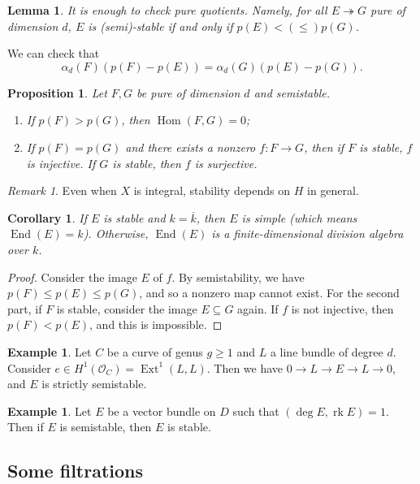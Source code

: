\documentclass[leqno, openany]{memoir}
\newtheorem{cor}[thm]{Corollary}
\newtheorem{prop}[thm]{Proposition}
\newtheorem{lem}[thm]{Lemma}
\theoremstyle{definition}
\newtheorem{exm}[thm]{Example}
\theoremstyle{remark}
\newtheorem{rmk}[thm]{Remark}
\theoremstyle{plain}
\theoremstyle{definition}
\theoremstyle{remark}
\newcommand{\mc}[1]{\mathcal{#1}}
\newcommand{\on}[1]{\operatorname{#1}}
\newcommand{\ol}[1]{\overline{#1}}
\DeclareMathOperator{\Hom}{Hom}
\DeclareMathOperator{\End}{End}
\DeclareMathOperator{\Ext}{Ext}
\begin{document}
\begin{lem}
    It is enough to check pure quotients. Namely, for all $E \twoheadrightarrow G$ pure of dimension $d$, $E$ is (semi)-stable if and only if $p(E) < (\leq) p(G)$.
\end{lem}
We can check that
\[ \alpha_d(F)(p(F) - p(E)) = \alpha_d(G)(p(E) - p(G)). \]

\begin{prop}
    Let $F, G$ be pure of dimension $d$ and semistable.
    \begin{enumerate}
        \item If $p(F) > p(G)$, then $\Hom(F, G) = 0$;
        \item If $p(F) = p(G)$ and there exists a nonzero $f \colon F \to G$, then if $F$ is stable, $f$ is injective. If $G$ is stable, then $f$ is surjective.
    \end{enumerate}
\end{prop}

\begin{rmk}
    Even when $X$ is integral, stability depends on $H$ in general.
\end{rmk}

\begin{cor}
    If $E$ is stable and $k = \ol{k}$, then $E$ is simple (which means $\End(E) = k$). Otherwise, $\End(E)$ is a finite-dimensional division algebra over $k$.
\end{cor}

\begin{proof}
    Consider the image $E$ of $f$. By semistability, we have $p(F) \leq p(E) \leq p(G)$, and so a nonzero map cannot exist. For the second part, if $F$ is stable, consider the image $E \subseteq G$ again. If $f$ is not injective, then $p(F) < p(E)$, and this is impossible.
\end{proof}

\begin{exm}
    Let $C$ be a curve of genus $g \geq 1$ and $L$ a line bundle of degree $d$. Consider $e \in H^1(\mc{O}_C) = \Ext^1(L, L)$. Then we have $0 \to L \to E \to L \to 0$, and $E$ is strictly semistable.
\end{exm}

\begin{exm}
    Let $E$ be a vector bundle on $D$ such that $(\deg E, \on{rk} E) = 1$. Then if $E$ is semistable, then $E$ is stable.
\end{exm}

\subsection{Some filtrations}%
\label{sub:some_filtrations}
\end{document}
